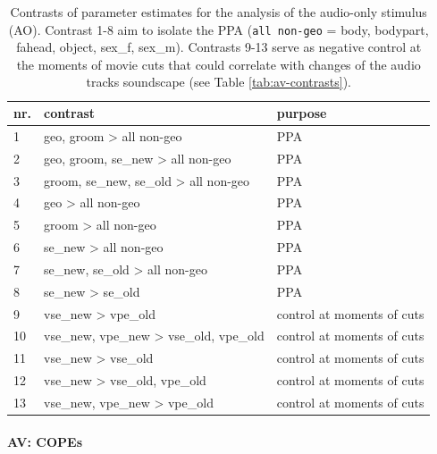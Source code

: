 \documentclass[english]{article}
\begin{document}
\begin{table}[t]
\caption{Contrasts of parameter estimates for the analysis of the audio-only stimulus (AO).
Contrast 1-8 aim to isolate the PPA (\texttt{all non-geo} = body, bodypart,
    fahead, object, sex\_f, sex\_m).
Contrasts 9-13 serve as negative control at the moments of movie cuts that could
    correlate with changes of the audio tracks soundscape (see Table \ref{tab:av-contrasts}).}

\label{tab:ao-contrasts}
\footnotesize
\begin{tabular}{lll}
\toprule
\textbf{nr.} &  \textbf{contrast} & \textbf{purpose} \\
\midrule
1 & geo, groom > all non-geo & PPA \tabularnewline
2 & geo, groom, se\_new > all non-geo & PPA \tabularnewline
3 & groom, se\_new, se\_old > all non-geo & PPA \tabularnewline
4 & geo > all non-geo & PPA \tabularnewline
5 & groom > all non-geo & PPA \tabularnewline
6 & se\_new > all non-geo & PPA \tabularnewline
7 & se\_new, se\_old > all non-geo & PPA \tabularnewline
8 & se\_new > se\_old & PPA \tabularnewline
9 & vse\_new > vpe\_old & control at moments of cuts \tabularnewline
10 & vse\_new, vpe\_new > vse\_old, vpe\_old & control at moments of cuts \tabularnewline
11 & vse\_new > vse\_old & control at moments of cuts \tabularnewline
12 & vse\_new > vse\_old, vpe\_old & control at moments of cuts \tabularnewline
13 & vse\_new, vpe\_new > vpe\_old & control at moments of cuts \tabularnewline
\end{tabular}
\end{table}


\paragraph{AV: COPEs}

\end{document}

